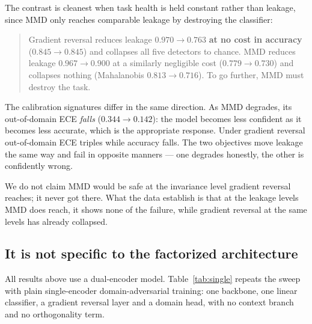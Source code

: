 \documentclass[11pt,a4paper]{article}
\begin{document}
The contrast is cleanest when task health is held constant rather than leakage, since
MMD only reaches comparable leakage by destroying the classifier:

\begin{quote}
Gradient reversal reduces leakage $0.970 \to 0.763$ \textbf{at no cost in accuracy}
($0.845 \to 0.845$) and collapses all five detectors to chance. MMD reduces leakage
$0.967 \to 0.900$ at a similarly negligible cost ($0.779 \to 0.730$) and collapses
nothing (Mahalanobis $0.813 \to 0.716$). To go further, MMD must destroy the task.
\end{quote}

The calibration signatures differ in the same direction. As MMD degrades, its
out-of-domain ECE \emph{falls} ($0.344 \to 0.142$): the model becomes less confident as
it becomes less accurate, which is the appropriate response. Under gradient reversal
out-of-domain ECE triples while accuracy falls. The two objectives move leakage the same
way and fail in opposite manners --- one degrades honestly, the other is confidently
wrong.

We do not claim MMD would be safe at the invariance level gradient reversal reaches; it
never got there. What the data establish is that at the leakage levels MMD does reach,
it shows none of the failure, while gradient reversal at the same levels has already
collapsed.

\subsection{It is not specific to the factorized architecture}
\label{sec:arch}

All results above use a dual-encoder model. Table~\ref{tab:single} repeats the sweep
with plain single-encoder domain-adversarial training: one backbone, one linear
classifier, a gradient reversal layer and a domain head, with no context branch and no
orthogonality term.
\end{document}

